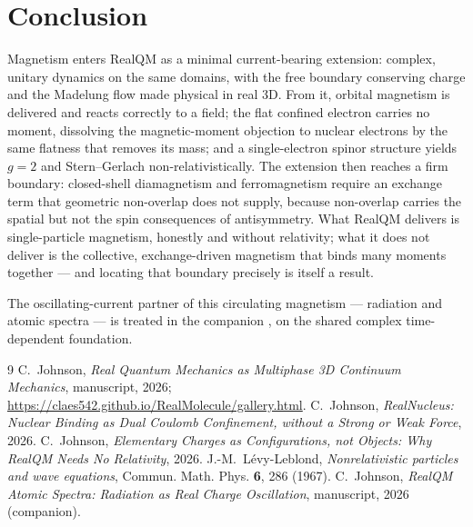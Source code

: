 \documentclass[11pt]{article}
\begin{document}
\section{Conclusion}
\label{sec:concl}

Magnetism enters RealQM as a minimal current-bearing extension: complex, unitary dynamics on the same
domains, with the free boundary conserving charge and the Madelung flow made physical in real 3D. From it,
orbital magnetism is delivered and reacts correctly to a field; the flat confined electron carries no
moment, dissolving the magnetic-moment objection to nuclear electrons by the same flatness that removes
its mass; and a single-electron spinor structure yields $g=2$ and Stern--Gerlach non-relativistically. The
extension then reaches a firm boundary: closed-shell diamagnetism and ferromagnetism require an exchange
term that geometric non-overlap does not supply, because non-overlap carries the spatial but not the spin
consequences of antisymmetry. What RealQM delivers is single-particle magnetism, honestly and without
relativity; what it does not deliver is the collective, exchange-driven magnetism that binds many moments
together --- and locating that boundary precisely is itself a result.

The oscillating-current partner of this circulating magnetism --- radiation and atomic spectra --- is treated
in the companion \cite{Spectra}, on the shared complex time-dependent foundation.

\begin{thebibliography}{9}
 C.~Johnson, \emph{Real Quantum Mechanics as Multiphase 3D Continuum Mechanics},
manuscript, 2026; \url{https://claes542.github.io/RealMolecule/gallery.html}.
 C.~Johnson, \emph{RealNucleus: Nuclear Binding as Dual Coulomb Confinement, without
a Strong or Weak Force}, 2026.
 C.~Johnson, \emph{Elementary Charges as Configurations, not Objects: Why RealQM Needs No
Relativity}, 2026.
 J.-M.~Lévy-Leblond, \emph{Nonrelativistic particles and wave equations},
Commun. Math. Phys. \textbf{6}, 286 (1967).
 C.~Johnson, \emph{RealQM Atomic Spectra: Radiation as Real Charge Oscillation},
manuscript, 2026 (companion).
\end{thebibliography}
\end{document}
